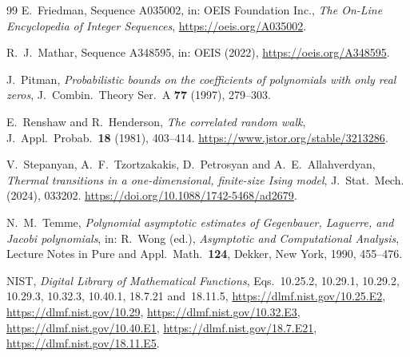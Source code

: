 \documentclass[11pt]{article}
\theoremstyle{definition}
\theoremstyle{remark}
\begin{document}
\begin{thebibliography}{99}
E.~Friedman, Sequence A035002, in: OEIS Foundation Inc., \emph{The On-Line Encyclopedia of Integer
Sequences}, \url{https://oeis.org/A035002}.

R.~J.~Mathar, Sequence A348595, in: OEIS (2022), \url{https://oeis.org/A348595}.

J.~Pitman, \emph{Probabilistic bounds on the coefficients of polynomials with only real zeros},
J.~Combin.\ Theory Ser.~A \textbf{77} (1997), 279--303.

E.~Renshaw and R.~Henderson, \emph{The correlated random walk}, J.\ Appl.\ Probab.\ \textbf{18}
(1981), 403--414.
\url{https://www.jstor.org/stable/3213286}.

V.~Stepanyan, A.~F.~Tzortzakakis, D.~Petrosyan and A.~E.~Allahverdyan,
\emph{Thermal transitions in a one-dimensional, finite-size Ising model},
J.~Stat.~Mech. (2024), 033202.
\url{https://doi.org/10.1088/1742-5468/ad2679}.

N.~M.~Temme, \emph{Polynomial asymptotic estimates of Gegenbauer, Laguerre, and Jacobi
polynomials}, in: R.~Wong (ed.), \emph{Asymptotic and Computational Analysis}, Lecture Notes in
Pure and Appl.\ Math.\ \textbf{124}, Dekker, New York, 1990, 455--476.

NIST, \emph{Digital Library of Mathematical Functions}, Eqs.~10.25.2, 10.29.1,
10.29.2, 10.29.3, 10.32.3, 10.40.1, 18.7.21 and~18.11.5,
\url{https://dlmf.nist.gov/10.25.E2}, \url{https://dlmf.nist.gov/10.29},
\url{https://dlmf.nist.gov/10.32.E3}, \url{https://dlmf.nist.gov/10.40.E1},
\url{https://dlmf.nist.gov/18.7.E21}, \url{https://dlmf.nist.gov/18.11.E5}.

\end{thebibliography}
\end{document}

